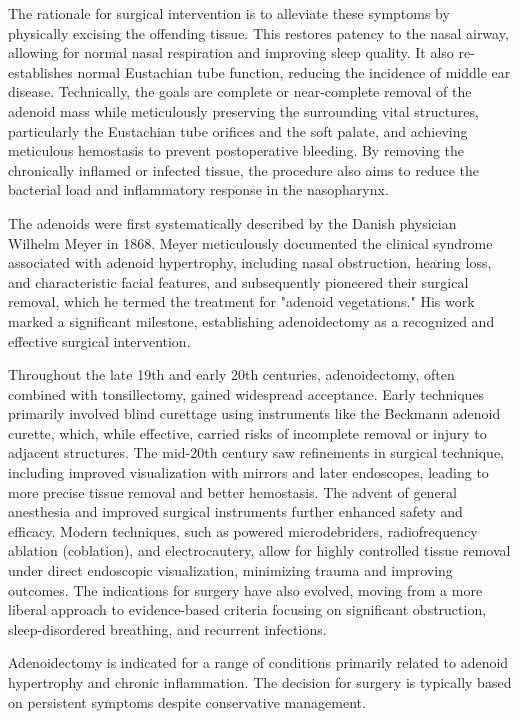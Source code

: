The rationale for surgical intervention is to alleviate these symptoms by physically excising the offending tissue. This restores patency to the nasal airway, allowing for normal nasal respiration and improving sleep quality. It also re-establishes normal Eustachian tube function, reducing the incidence of middle ear disease. Technically, the goals are complete or near-complete removal of the adenoid mass while meticulously preserving the surrounding vital structures, particularly the Eustachian tube orifices and the soft palate, and achieving meticulous hemostasis to prevent postoperative bleeding. By removing the chronically inflamed or infected tissue, the procedure also aims to reduce the bacterial load and inflammatory response in the nasopharynx.

The adenoids were first systematically described by the Danish physician Wilhelm Meyer in 1868. Meyer meticulously documented the clinical syndrome associated with adenoid hypertrophy, including nasal obstruction, hearing loss, and characteristic facial features, and subsequently pioneered their surgical removal, which he termed the treatment for "adenoid vegetations." His work marked a significant milestone, establishing adenoidectomy as a recognized and effective surgical intervention.

Throughout the late 19th and early 20th centuries, adenoidectomy, often combined with tonsillectomy, gained widespread acceptance. Early techniques primarily involved blind curettage using instruments like the Beckmann adenoid curette, which, while effective, carried risks of incomplete removal or injury to adjacent structures. The mid-20th century saw refinements in surgical technique, including improved visualization with mirrors and later endoscopes, leading to more precise tissue removal and better hemostasis. The advent of general anesthesia and improved surgical instruments further enhanced safety and efficacy. Modern techniques, such as powered microdebriders, radiofrequency ablation (coblation), and electrocautery, allow for highly controlled tissue removal under direct endoscopic visualization, minimizing trauma and improving outcomes. The indications for surgery have also evolved, moving from a more liberal approach to evidence-based criteria focusing on significant obstruction, sleep-disordered breathing, and recurrent infections.

Adenoidectomy is indicated for a range of conditions primarily related to adenoid hypertrophy and chronic inflammation. The decision for surgery is typically based on persistent symptoms despite conservative management.

